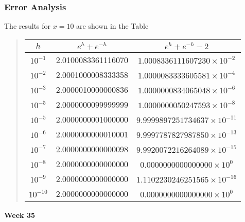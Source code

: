 \documentclass{beamer}
\newenvironment{block_mdfboxadmon}[1][]{\begin{block}{#1}}{\end{block}}
\begin{document}
\begin{frame}
\frametitle{Error Analysis}

\begin{block_mdfboxadmon}[]
The results for $x=10$ are shown in the Table


\begin{quote}
\begin{tabular}{ccc}
\hline
\multicolumn{1}{c}{ $h$ } & \multicolumn{1}{c}{ $e^{h}+e^{-h}$ } & \multicolumn{1}{c}{ $e^{h}+e^{-h}-2$ } \\
\hline
$10^{-1}$                           & 2.0100083361116070                  & $1.0008336111607230\times 10^{-2}$  \\
$10^{-2}$                           & 2.0001000008333358                  & $1.0000083333605581\times 10^{-4}$  \\
$10^{-3}$                           & 2.0000010000000836                  & $1.0000000834065048\times 10^{-6}$  \\
$10^{-5}$                           & 2.0000000099999999                  & $1.0000000050247593\times 10^{-8}$  \\
$10^{-5}$                           & 2.0000000001000000                  & $9.9999897251734637\times 10^{-11}$ \\
$10^{-6}$                           & 2.0000000000010001                  & $9.9997787827987850\times 10^{-13}$ \\
$10^{-7}$                           & 2.0000000000000098                  & $9.9920072216264089\times 10^{-15}$ \\
$10^{-8}$                           & 2.0000000000000000                  & $0.0000000000000000\times 10^{0}$   \\
$10^{-9}$                           & 2.0000000000000000                  & $1.1102230246251565\times 10^{-16}$ \\
$10^{-10}$                          & 2.0000000000000000                  & $0.0000000000000000\times 10^{0}$   \\
\hline
\end{tabular}
\end{quote}

\noindent
\end{block_mdfboxadmon}




\noindent\textbf{\Large Week 35}
\end{frame}
\end{document}
